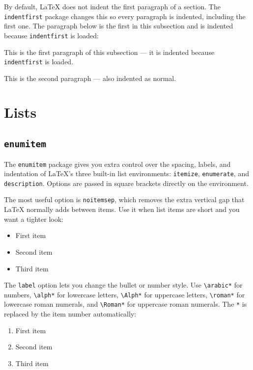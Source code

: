 By default, \LaTeX{} does not indent the first paragraph of a section. The \texttt{indentfirst} package changes this so every paragraph is indented, including the first one. The paragraph below is the first in this subsection and is indented because \texttt{indentfirst} is loaded:

This is the first paragraph of this subsection — it is indented because \texttt{indentfirst} is loaded.

This is the second paragraph — also indented as normal.

\section{Lists}\label{sec:lists}

\subsection{\texttt{enumitem}}
The \texttt{enumitem} package gives you extra control over the spacing, labels, and indentation of \LaTeX's three built-in list environments: \texttt{itemize}, \texttt{enumerate}, and \texttt{description}. Options are passed in square brackets directly on the environment.

The most useful option is \texttt{noitemsep}, which removes the extra vertical gap that \LaTeX{} normally adds between items. Use it when list items are short and you want a tighter look:

\begin{itemize}[noitemsep]
	\item First item
	\item Second item
	\item Third item
\end{itemize}

The \texttt{label} option lets you change the bullet or number style. Use \texttt{\textbackslash arabic*} for numbers, \texttt{\textbackslash alph*} for lowercase letters, \texttt{\textbackslash Alph*} for uppercase letters, \texttt{\textbackslash roman*} for lowercase roman numerals, and \texttt{\textbackslash Roman*} for uppercase roman numerals. The \texttt{*} is replaced by the item number automatically:

\begin{enumerate}[label=\textbf{\arabic*.}, noitemsep]
	\item First item
	\item Second item
	\item Third item
\end{enumerate}

